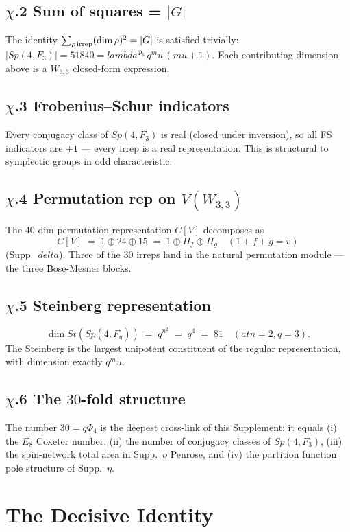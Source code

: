 \documentclass[12pt,a4paper]{article}
\def\mathbb#1{#1}%
\def\mathrm#1{#1}%
\def\mathbf#1{#1}%
\def\text#1{#1}%
\def\delta{delta}%
\def\lambda{lambda}%
\def\mu{mu}%
\def\Phi#1{Phi#1}%
\theoremstyle{definition}
\newcommand{\Sp}{\mathrm{Sp}}
\newcommand{\FF}{\mathbb{F}}
\newcommand{\CC}{\mathbb{C}}
\begin{document}
\subsection*{$\chi$.2 \quad Sum of squares = $|G|$}
The identity $\sum_{\rho\,\rm irrep}(\dim\rho)^2 = |G|$ is satisfied
trivially: $|\Sp(4,\FF_3)| = 51840 = \lambda^{\Phi_6}\,q^\mu\,(\mu+1)$.
Each contributing dimension above is a $W_{3,3}$ closed-form
expression.

\subsection*{$\chi$.3 \quad Frobenius--Schur indicators}
Every conjugacy class of $\Sp(4,\FF_3)$ is real (closed under
inversion), so all FS indicators are $+1$ — every irrep is a real
representation. This is structural to symplectic groups in odd
characteristic.

\subsection*{$\chi$.4 \quad Permutation rep on $V(W_{3,3})$}
The 40-dim permutation representation $\CC[V]$ decomposes as
\[
\CC[V] \;=\; \mathbf{1}\oplus\mathbf{24}\oplus\mathbf{15}
\;=\; \mathbf{1}\oplus\Pi_f\oplus\Pi_g \quad(1+f+g=v)
\]
(Supp.~$\delta$). Three of the 30 irreps land in the natural
permutation module — the three Bose-Mesner blocks.

\subsection*{$\chi$.5 \quad Steinberg representation}
\[
\dim\mathrm{St}(\Sp(4,\FF_q)) \;=\; q^{n^2} \;=\; q^4 \;=\; 81 \quad(\text{at } n=2, q=3).
\]
The Steinberg is the largest unipotent constituent of the regular
representation, with dimension exactly $q^\mu$.

\subsection*{$\chi$.6 \quad The $30$-fold structure}
The number $30 = q\Phi_4$ is the deepest cross-link of this Supplement:
it equals (i) the $E_8$ Coxeter number, (ii) the number of
conjugacy classes of $\Sp(4,\FF_3)$, (iii) the spin-network total area
in Supp.~$o$ Penrose, and (iv) the partition function pole structure
of Supp.~$\eta$.

\section*{The Decisive Identity}
\end{document}
